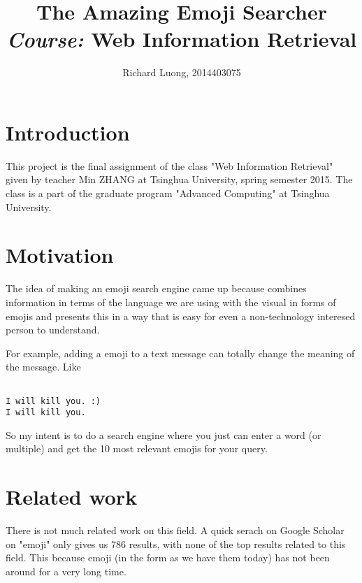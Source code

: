 \documentclass[a4paper]{article}
\author{Richard Luong, 2014403075}
\title{The Amazing Emoji Searcher\\ 
\large \emph{Course: }Web Information Retrieval}
\begin{document}
\maketitle
\pagebreak
\tableofcontents
\pagebreak

\section{Introduction} %
\label{sec:introduction}

This project is the final assignment of the class "Web Information Retrieval" given by teacher Min ZHANG at Tsinghua University, spring semester 2015. The class is a part of the graduate program "Advanced Computing" at Tsinghua University.


\section{Motivation} %
\label{sec:motivation}

The idea of making an emoji search engine came up because combines information in terms of the language we are using with the visual in forms of emojis and presents this in a way that is easy for even a non-technology interesed person to understand.

For example, adding a emoji to a text message can totally change the meaning of the message. Like

\begin{verbatim}

I will kill you. :)
I will kill you.

\end{verbatim}
    
So my intent is to do a search engine where you just can enter a word (or multiple) and get the 10 most relevant emojis for your query.


\section{Related work} %
\label{sec:related_work}

There is not much related work on this field. A quick serach on Google Scholar on "emoji" only gives us 786 results, with none of the top results related to this field. This because emoji (in the form as we have them today) has not been around for a very long time.
\end{document}
